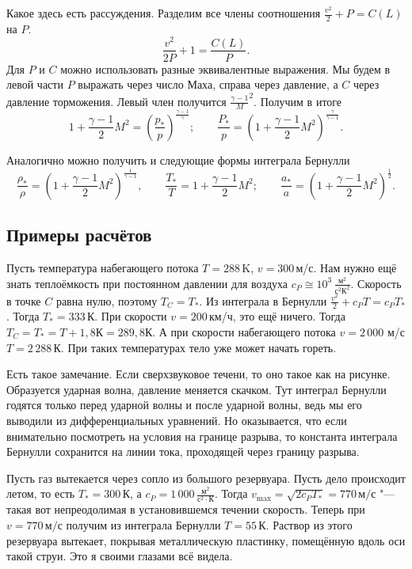 Какое здесь есть рассуждения. Разделим все члены соотношения $\frac{v^2}2+P = C(L)$ на $P$.
\[\frac{v^2}{2P} + 1 = \frac{C(L)}P.\]
Для $P$ и $C$ можно использовать разные эквивалентные выражения. Мы будем в левой части $P$ выражать через число Маха, справа через давление, а $C$ через давление торможения. Левый член получится $\frac{\gamma-1} M^2$. Получим в итоге
\[
  1+\frac{\gamma-1}2M^2 = \left(\frac{p_*}p\right)^{\frac{\gamma-1}\gamma};\qquad \frac{P_*}p = \left(1+\frac{\gamma-1}2 M^2\right)^{\frac\gamma{\gamma-1}}.
\]

Аналогично можно получить и следующие формы интеграла Бернулли
\[
  \frac{\rho_*}\rho = \left(1+\frac{\gamma-1}2 M^2\right)^{\frac1{\gamma-1}},\qquad \frac{T_*}T = 1+\frac{\gamma-1}2 M^2;\qquad \frac{a_*}a=\left(1+\frac{\gamma-1}2M^2\right)^{\frac12}.
\]

\subsection{Примеры расчётов}
Пусть температура набегающего потока $T=288$\,K, $v=300$\,м/с. Нам нужно ещё знать теплоёмкость при постоянном давлении для воздуха $c_P\cong 10^3\,\frac{\text{м}^2}{\text{с}^2\text{К}^2}$. Скорость в точке $C$ равна нулю, поэтому $T_C = T_*$. Из интеграла в Бернулли $\frac{v^2}2+c_P T=c_PT_*$. Тогда $T_* = 333\,$К. При скорости $v = 200$\,км/ч, это ещё ничего. Тогда $T_C = T_* = T+1{,}8\text{К}=289{,}8\text{К}$. А при скорости набегающего потока $v = 2\,000\,$\,м/с $T = 2\,288$\,К. При таких температурах тело уже может начать гореть.

Есть такое замечание. Если сверхзвуковое течени, то оно такое как на рисунке. Образуется ударная волна, давление меняется скачком. Тут интеграл Бернулли годятся только перед ударной волны и после ударной волны, ведь мы его выводили из дифференциальных уравнений. Но оказывается, что если внимательно посмотреть на условия на границе разрыва, то константа интеграла Бернулли сохранится на линии тока, проходящей через границу разрыва.

Пусть газ вытекается через сопло из большого резервуара. Пусть дело происходит летом, то есть $T_* = 300$\,К, а $c_P = 1\,000\,\frac{\text{м}^2}{\text{с}^2\cdot \text{К}}$. Тогда $v_{\max} = \sqrt{2 c_P T_*} = 770\,\text{м}/\text{с}$ "--- такая вот непреодолимая в установившемся течении скорость. Теперь при $v=770\,\text{м}/\text{с}$ получим из интеграла Бернулли $T = 55$\,К. Раствор из этого резервуара вытекает, покрывая металлическую пластинку, помещённую вдоль оси такой струи. Это я своими глазами всё видела.


